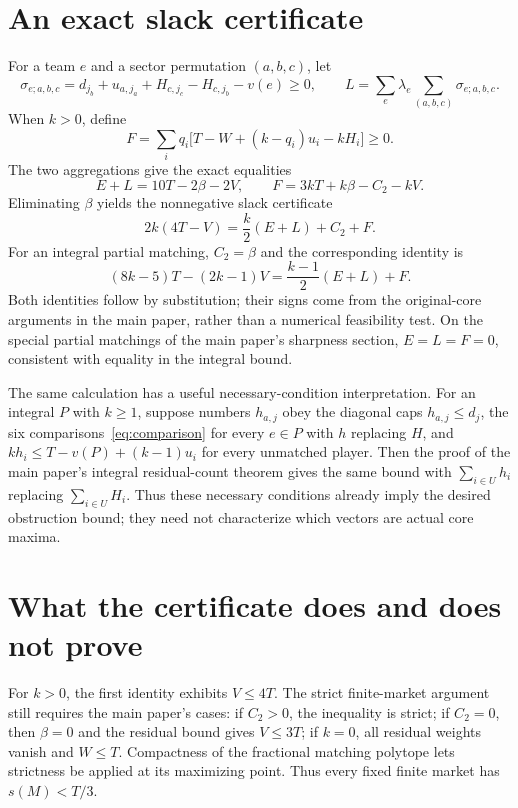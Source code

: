 \documentclass[11pt]{article}
\theoremstyle{remark}
\begin{document}
\section{An exact slack certificate}\label{sec:slack}
For a team $e$ and a sector permutation $(a,b,c)$, let
\[
 \sigma_{e;a,b,c}
    =d_{j_b}+u_{a,j_a}+H_{c,j_c}-H_{c,j_b}-v(e)\ge0,
 \qquad
 L=\sum_e\lambda_e\sum_{(a,b,c)}\sigma_{e;a,b,c}.
\]
When $k>0$, define
\[
                  F=\sum_iq_i\bigl[T-W+(k-q_i)u_i-kH_i\bigr]\ge0.
\]
The two aggregations give the exact equalities
\[
       E+L=10T-2\beta-2V,\qquad F=3kT+k\beta-C_2-kV.
\]
Eliminating $\beta$ yields the nonnegative slack certificate
\begin{equation}\label{eq:slack}
                 2k(4T-V)=\frac{k}{2}(E+L)+C_2+F.
\end{equation}
For an integral partial matching, $C_2=\beta$ and the corresponding identity is
\begin{equation}\label{eq:integralslack}
                 (8k-5)T-(2k-1)V=\frac{k-1}{2}(E+L)+F.
\end{equation}
Both identities follow by substitution; their signs come from the
original-core arguments in the main paper, rather than a numerical feasibility test.
On the special partial matchings of the main paper's sharpness section, $E=L=F=0$,
consistent with equality in the integral bound.

The same calculation has a useful necessary-condition interpretation.
For an integral $P$ with $k\ge1$, suppose numbers $h_{a,j}$ obey the diagonal caps
$h_{a,j}\le d_j$, the six comparisons~\eqref{eq:comparison} for every
$e\in P$ with $h$ replacing $H$, and
$kh_i\le T-v(P)+(k-1)u_i$ for every unmatched player.
Then the proof of the main paper's integral residual-count theorem gives the same bound with
$\sum_{i\in U}h_i$ replacing $\sum_{i\in U}H_i$.
Thus these necessary conditions already imply the desired obstruction
bound; they need not characterize which vectors are actual core maxima.


\section{What the certificate does and does not prove}
For $k>0$, the first identity exhibits $V\le4T$. The strict finite-market
argument still requires the main paper's cases: if $C_2>0$, the inequality
is strict; if $C_2=0$, then $\beta=0$ and the residual bound gives $V\le3T$;
if $k=0$, all residual weights vanish and $W\le T$. Compactness of the
fractional matching polytope lets strictness be applied at its maximizing
point. Thus every fixed finite market has $s(M)<T/3$.
\end{document}
